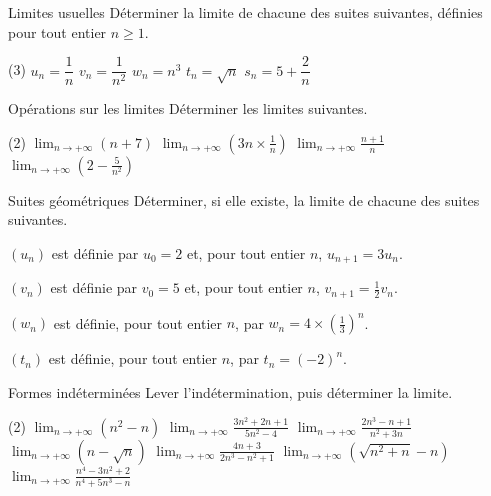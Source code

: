 \begin{exercice}[1]{Limites usuelles}
Déterminer la limite de chacune des suites suivantes, définies pour tout entier $n\geq1$.
\begin{tasks}(3)
  \task $u_n=\dfrac{1}{n}$
  \task $v_n=\dfrac{1}{n^{2}}$
  \task $w_n=n^{3}$
  \task $t_n=\sqrt{n}$
  \task $s_n=5+\dfrac{2}{n}$
\end{tasks}
\end{exercice}

\begin{exercice}[1]{Opérations sur les limites}
Déterminer les limites suivantes.
\begin{tasks}(2)
  \task $\displaystyle\lim_{n\to+\infty}(n+7)$
  \task $\displaystyle\lim_{n\to+\infty}\left(3n\times\frac{1}{n}\right)$
  \task $\displaystyle\lim_{n\to+\infty}\frac{n+1}{n}$
  \task $\displaystyle\lim_{n\to+\infty}\left(2-\frac{5}{n^{2}}\right)$
\end{tasks}
\end{exercice}


\begin{exercice}[2]{Suites géométriques}
Déterminer, si elle existe, la limite de chacune des suites suivantes.
\begin{questions}
  \item $(u_n)$ est définie par $u_0=2$ et, pour tout entier $n$, $u_{n+1}=3u_n$.
  \item $(v_n)$ est définie par $v_0=5$ et, pour tout entier $n$, $v_{n+1}=\frac{1}{2}v_n$.
  \item $(w_n)$ est définie, pour tout entier $n$, par $w_n=4\times\left(\frac{1}{3}\right)^{n}$.
  \item $(t_n)$ est définie, pour tout entier $n$, par $t_n=(-2)^{n}$.
\end{questions}
\end{exercice}

\begin{exercice}[2]{Formes indéterminées}
Lever l'indétermination, puis déterminer la limite.
\begin{tasks}(2)
  \task $\displaystyle\lim_{n\to+\infty}(n^{2}-n)$
  \task $\displaystyle\lim_{n\to+\infty}\frac{3n^{2}+2n+1}{5n^{2}-4}$
  \task $\displaystyle\lim_{n\to+\infty}\frac{2n^{3}-n+1}{n^{2}+3n}$
  \task $\displaystyle\lim_{n\to+\infty}(n-\sqrt{n})$
  \task $\displaystyle\lim_{n\to+\infty}\frac{4n+3}{2n^{3}-n^{2}+1}$
  \task $\displaystyle\lim_{n\to+\infty}\left(\sqrt{n^{2}+n}-n\right)$
  \task $\displaystyle\lim_{n\to+\infty}\frac{n^{4}-3n^{2}+2}{n^{4}+5n^{3}-n}$
\end{tasks}
\end{exercice}

